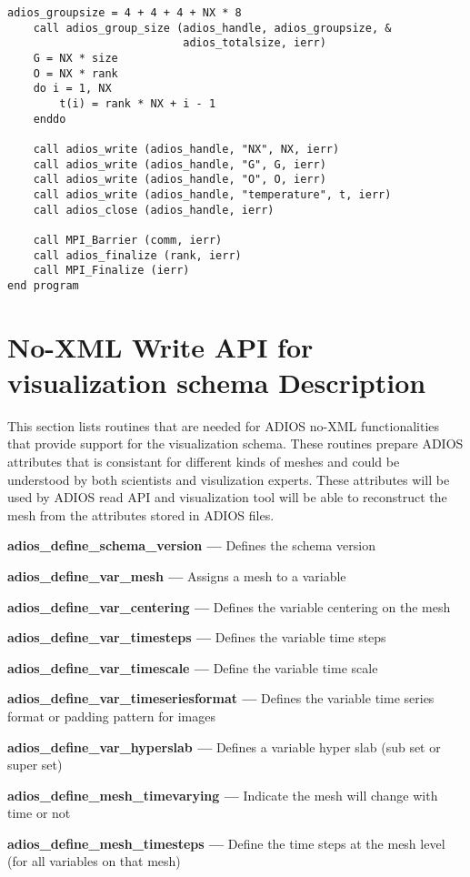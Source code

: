\begin{lstlisting}[alsolanguage=Fortran,caption={ADIOS no-XML example},label={}]
    adios_groupsize = 4 + 4 + 4 + NX * 8
    call adios_group_size (adios_handle, adios_groupsize, &
                           adios_totalsize, ierr)
    G = NX * size 
    O = NX * rank 
    do i = 1, NX
        t(i) = rank * NX + i - 1 
    enddo
    
    call adios_write (adios_handle, "NX", NX, ierr)
    call adios_write (adios_handle, "G", G, ierr)
    call adios_write (adios_handle, "O", O, ierr)
    call adios_write (adios_handle, "temperature", t, ierr)
    call adios_close (adios_handle, ierr) 

    call MPI_Barrier (comm, ierr)
    call adios_finalize (rank, ierr)
    call MPI_Finalize (ierr) 
end program
\end{lstlisting}


\section{No-XML Write API for visualization schema Description}
This section lists routines that are needed for ADIOS no-XML functionalities
that provide support for the visualization schema. These routines prepare ADIOS
attributes that is consistant for different kinds of meshes and could be
understood by both scientists and visulization experts. These attributes will
be used by ADIOS read API and visualization tool will be able to reconstruct the
mesh from the attributes stored in ADIOS files.

\textbf{adios\_define\_schema\_version ---} Defines the schema version

\textbf{adios\_define\_var\_mesh ---} Assigns a mesh to a variable

\textbf{adios\_define\_var\_centering ---} Defines the variable centering on the mesh

\textbf{adios\_define\_var\_timesteps ---} Defines the variable time steps

\textbf{adios\_define\_var\_timescale ---} Define the variable time scale

\textbf{adios\_define\_var\_timeseriesformat ---} Defines the variable time series format or padding pattern for images

\textbf{adios\_define\_var\_hyperslab ---} Defines a variable hyper slab (sub set or super set)

\textbf{adios\_define\_mesh\_timevarying ---} Indicate the mesh will change with time or not

\textbf{adios\_define\_mesh\_timesteps ---} Define the time steps at the mesh level (for all variables on that mesh)

